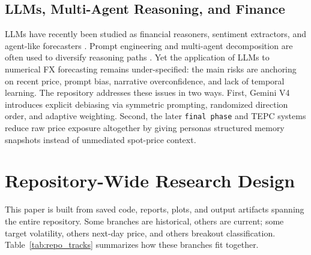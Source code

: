 \documentclass[11pt,a4paper]{article}
\begin{document}
\subsection{LLMs, Multi-Agent Reasoning, and Finance}

LLMs have recently been studied as financial reasoners, sentiment extractors, and agent-like forecasters \citep{lopez2023, xie2023, wu2023bloomberggpt, li2024llm}. Prompt engineering and multi-agent decomposition are often used to diversify reasoning paths \citep{wei2022}. Yet the application of LLMs to numerical FX forecasting remains under-specified: the main risks are anchoring on recent price, prompt bias, narrative overconfidence, and lack of temporal learning. The repository addresses these issues in two ways. First, Gemini V4 introduces explicit debiasing via symmetric prompting, randomized direction order, and adaptive weighting. Second, the later \texttt{final phase} and TEPC systems reduce raw price exposure altogether by giving personas structured memory snapshots instead of unmediated spot-price context.

\section{Repository-Wide Research Design}

This paper is built from saved code, reports, plots, and output artifacts spanning the entire repository. Some branches are historical, others are current; some target volatility, others next-day price, and others breakout classification. Table~\ref{tab:repo_tracks} summarizes how these branches fit together.
\end{document}
